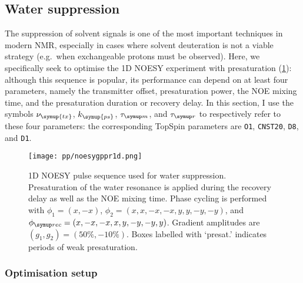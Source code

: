 \subsection{Water suppression}
\label{subsec:poise__solvsupp}

The suppression of solvent signals is one of the most important techniques in modern NMR, especially in cases where solvent deuteration is not a viable strategy (e.g.\ when exchangeable protons must be observed).\autocite{Hore1983JMR,Zheng2010PNMRS,Giraudeau2015M}
Here, we specifically seek to optimise the 1D NOESY experiment with presaturation\autocite{Mckay2011CMR} (\cref{fig:poise_solvsupp_pulseq}): although this sequence is popular, its performance can depend on at least four parameters, namely the transmitter offset, presaturation power, the NOE mixing time, and the presaturation duration or recovery delay.
In this section, I use the symbols $\nu_{\symup{tx}}$, $k_{\symup{ps}}$, $\taum$, and $\taur$ to respectively refer to these four parameters: the corresponding TopSpin parameters are \texttt{O1}, \texttt{CNST20}, \texttt{D8}, and \texttt{D1}.

\begin{figure}[htb]
    \centering
    \texttt{[image: pp/noesygppr1d.png]}%
    \caption[1D NOESY pulse sequence for water suppression]{
        1D NOESY pulse sequence used for water suppression.
        Presaturation of the water resonance is applied during the recovery delay as well as the NOE mixing time.
        Phase cycling is performed with $\phi_1 = (x, -x)$, $\phi_2 = (x, x, -x, -x, y, y, -y, -y)$, and $\phirec = (x, -x, -x, x, y, -y, -y, y)$.
        Gradient amplitudes are $(g_1, g_2) = (50\%, -10\%)$.
        Boxes labelled with `presat.' indicates periods of weak presaturation.
    }
    \label{fig:poise_solvsupp_pulseq}
\end{figure}


\subsubsection{Optimisation setup}

